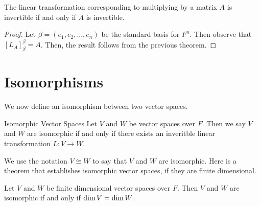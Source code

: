 \documentclass[main.tex]{subfiles}
\begin{document}
     \begin{cor}{}{}
         The linear transformation corresponding to multiplying by a matrix $A$ is invertible if and only if $A$ is invertible. 
     \end{cor}
     \begin{proof}
         Let $\beta = (e_1, e_2, ..., e_n)$ be the standard basis for $F^n$. Then observe that $[L_A]_\beta^\beta = A$. Then, the result follows from the previous theorem.
     \end{proof}

     \section{Isomorphisms}
     We now define an isomorphism between two vector spaces. 
     \begin{defn}{Isomorphic Vector Spaces}{}
         Let $V$ and $W$ be vector spaces over $F$. Then we say $V$ and $W$ are isomorphic if and only if there exists an inveritble linear transformation $L:V\to W$.
     \end{defn}
     We use the notation $V \cong W$ to say that $V$ and $W$ are isomorphic. Here is a theorem that establishes isomorphic vector spaces, if they are finite dimensional. 

     \begin{thrm}{}{}
         Let $V$ and $W$ be finite dimensional vector spaces over $F$. Then $V$ and $W$ are isomorphic if and only if $\operatorname{dim} V = \operatorname{dim} W$.
     \end{thrm}
\end{document}
